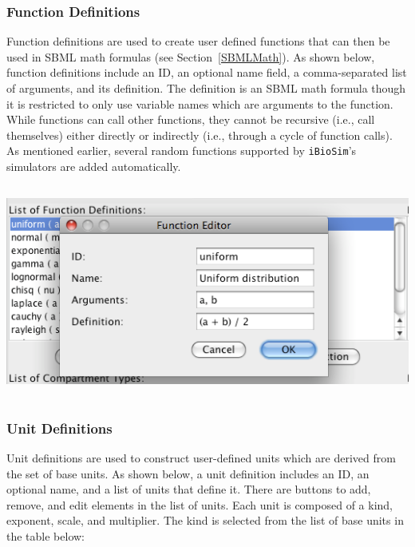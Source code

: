 \documentclass[titlepage,11pt]{article}
\begin{document}
\subsubsection{\label{funcDefn}Function Definitions}

\noindent
Function definitions are used to create user defined functions that
can then be used in SBML math formulas (see Section~\ref{SBMLMath}).  
As shown below, function definitions include an ID, an optional name field, a 
comma-separated list of arguments, and its definition.  The definition 
is an SBML math formula though it is restricted to only use variable 
names which are arguments to the function.  While functions can
call other functions, they cannot be recursive (i.e., call themselves) 
either directly or indirectly (i.e., through a cycle of function calls).
As mentioned earlier, several random functions supported by 
{\tt iBioSim}'s simulators are added automatically.
\begin{center}
\includegraphics[height=70mm]{screenshots/function}
\end{center}

\subsubsection{\label{unitDefn}Unit Definitions}

\noindent
Unit definitions are used to construct user-defined units which are 
derived from the set of base units.  As shown below, a 
unit definition includes an ID, 
an optional name, and a list of units that define it.  There are
buttons to add, remove, and edit elements in the list of units.  
Each unit is composed of a kind, exponent, scale, and multiplier.  The kind 
is selected from the list of base units in the table below:
\end{document}
